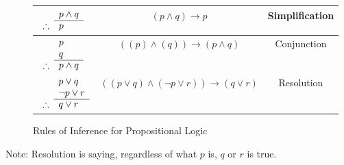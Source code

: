 \documentclass[article, 11pt]{article}
\theoremstyle{definition}
\begin{document}
\begin{figure}[H]
\begin{tabular}{|l|c|c|}
            \hline
            $\begin{array}{rl}
                & p \land q \\
                \cline{2-2}
                \therefore & p
            \end{array}$ & $(p \land q) \to p$ & Simplification \\
            \hline
            $\begin{array}{rl}
                & p \\
                & q \\
                \cline{2-2}
                \therefore & p \land q
            \end{array}$ & $((p) \land (q)) \to (p \land q)$ & Conjunction \\
            \hline
            $\begin{array}{rl}
                & p \lor q \\
                & \neg p \lor r \\
                \cline{2-2}
                \therefore & q \lor r
            \end{array}$ & $((p \lor q) \land (\neg p \lor r)) \to (q \lor r)$ & Resolution \\
            \hline
        \end{tabular}
        \caption{Rules of Inference for Propositional Logic}
    \end{figure}
    Note: Resolution is saying, regardless of what $p$ is, $q$ or $r$ is true.
\end{document}
